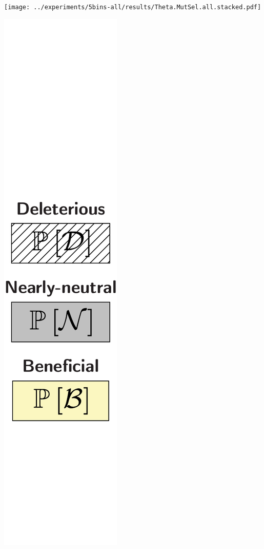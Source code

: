 \documentclass{article}
\begin{document}
    \begin{center}
        \begin{minipage}{0.9\linewidth}
            \texttt{[image: ../experiments/5bins-all/results/Theta.MutSel.all.stacked.pdf]}
        \end{minipage}
        \begin{minipage}{0.09\linewidth}
            \includegraphics[width=\linewidth, page=1]{artworks/legend.polycat}

\end{minipage}
\end{center}
\end{document}

